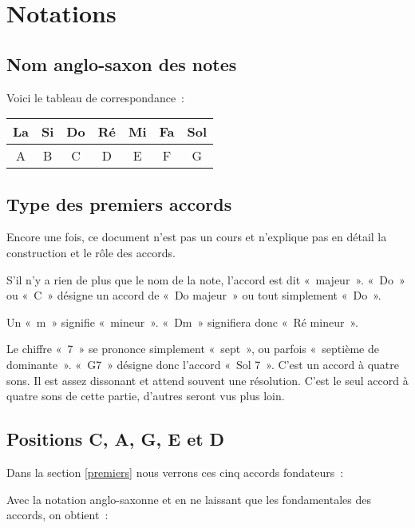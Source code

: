 \documentclass[11pt]{article}
\begin{document}
\section{Notations}

\subsection{Nom anglo-saxon des notes}

Voici le tableau de correspondance~:

\begin{tabular}{ | c | c | c | c | c | c | c | }
    \hline
    La & Si & Do & Ré & Mi & Fa & Sol \\
    \hline
    A & B & C & D & E & F & G \\
    \hline
\end{tabular}

\subsection{Type des premiers accords}

Encore une fois, ce document n’est pas un cours et n’explique pas en détail
la construction et le rôle des accords.

S’il n’y a rien de plus que le nom de la note, l’accord est dit «~majeur~».
«~Do~» ou «~C~» désigne un accord de «~Do majeur~» ou tout simplement «~Do~».

Un «~m~» signifie «~mineur~». «~Dm~» signifiera donc «~Ré mineur~».

Le chiffre «~7~» se prononce simplement «~sept~», ou parfois «~septième de
dominante~». «~G7~» désigne donc l’accord «~Sol 7~».
C’est un accord à quatre sons. Il est assez dissonant et
attend souvent une résolution. C’est le seul accord à quatre sons de cette
partie, d’autres seront vus plus loin.

\subsection{Positions C, A, G, E et D}

Dans la section \ref{premiers} nous verrons ces cinq accords fondateurs :


Avec la notation anglo-saxonne et en ne laissant que les fondamentales des
accords, on obtient :

\end{document}
